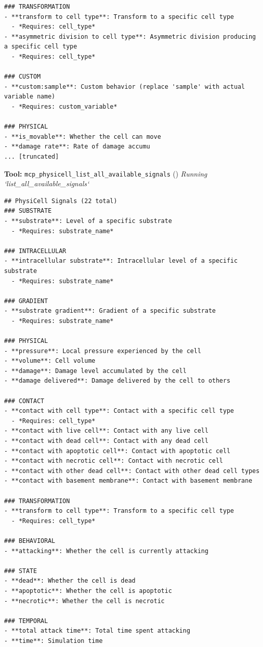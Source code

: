 \documentclass[11pt,a4paper]{article}
\begin{document}
\begin{toolokbox}
\begin{lstlisting}
### TRANSFORMATION
- **transform to cell type**: Transform to a specific cell type
  - *Requires: cell_type*
- **asymmetric division to cell type**: Asymmetric division producing a specific cell type
  - *Requires: cell_type*

### CUSTOM
- **custom:sample**: Custom behavior (replace 'sample' with actual variable name)
  - *Requires: custom_variable*

### PHYSICAL
- **is_movable**: Whether the cell can move
- **damage rate**: Rate of damage accumu
... [truncated]
\end{lstlisting}
\end{toolokbox}
\begin{toolokbox}
\textbf{Tool:} \texttt{mcp\_physicell\_list\_all\_available\_signals} (\checkmark)
\textit{Running `list\_all\_available\_signals`}
\begin{lstlisting}
## PhysiCell Signals (22 total)
### SUBSTRATE
- **substrate**: Level of a specific substrate
  - *Requires: substrate_name*

### INTRACELLULAR
- **intracellular substrate**: Intracellular level of a specific substrate
  - *Requires: substrate_name*

### GRADIENT
- **substrate gradient**: Gradient of a specific substrate
  - *Requires: substrate_name*

### PHYSICAL
- **pressure**: Local pressure experienced by the cell
- **volume**: Cell volume
- **damage**: Damage level accumulated by the cell
- **damage delivered**: Damage delivered by the cell to others

### CONTACT
- **contact with cell type**: Contact with a specific cell type
  - *Requires: cell_type*
- **contact with live cell**: Contact with any live cell
- **contact with dead cell**: Contact with any dead cell
- **contact with apoptotic cell**: Contact with apoptotic cell
- **contact with necrotic cell**: Contact with necrotic cell
- **contact with other dead cell**: Contact with other dead cell types
- **contact with basement membrane**: Contact with basement membrane

### TRANSFORMATION
- **transform to cell type**: Transform to a specific cell type
  - *Requires: cell_type*

### BEHAVIORAL
- **attacking**: Whether the cell is currently attacking

### STATE
- **dead**: Whether the cell is dead
- **apoptotic**: Whether the cell is apoptotic
- **necrotic**: Whether the cell is necrotic

### TEMPORAL
- **total attack time**: Total time spent attacking
- **time**: Simulation time


\end{lstlisting}
\end{toolokbox}
\end{document}
